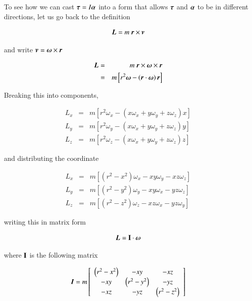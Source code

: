 To see how we can cast ${\boldsymbol{\tau}}=I{\boldsymbol{\alpha}}$ into a form that allows ${\boldsymbol{\tau}}$ and ${\boldsymbol{\alpha}}$ to be in different directions, let us go back to the definition 

\begin{equation}
{\boldsymbol{L}}=m \ {\boldsymbol{r}}\times {\boldsymbol{v}}
\end{equation}

and write ${\boldsymbol{v}} = {\boldsymbol{\omega}}\times{\boldsymbol{r}}$


\begin{eqnarray}
{\boldsymbol{L}} &=& m \ {\boldsymbol{r}}\times {\boldsymbol{\omega}}\times{\boldsymbol{r}}\\
 &=& m \left[r^2{\boldsymbol{\omega}} -  \left({\boldsymbol{r}}\cdot {\boldsymbol{\omega}}\right){\boldsymbol{r}}\right]\\
\end{eqnarray}


Breaking this into components,  

\begin{eqnarray}
L_x &=& m \left[r^2\omega_x -  \left(x\omega_x + y\omega_y + z\omega_z\right)x\right]\\
L_y &=& m \left[r^2\omega_y -  \left(x\omega_x + y\omega_y + z\omega_z\right)y\right]\\
L_z &=& m \left[r^2\omega_z -  \left(x\omega_x + y\omega_y + z\omega_z\right)z\right]
\end{eqnarray}


and distributing the coordinate  

\begin{eqnarray}
L_x &=& m \left[\left(r^2-x^2\right)\omega_x -  xy\omega_y - xz\omega_z\right]\\
L_y &=& m \left[\left(r^2-y^2\right)\omega_y -  xy\omega_x - yz\omega_z\right]\\
L_z &=& m \left[\left(r^2-z^2\right)\omega_z -  xz\omega_x - yz\omega_y\right]
\end{eqnarray}


writing this in matrix form

\begin{equation}
{\boldsymbol{L}}= \boldsymbol{\mathrm{I}} \cdot {\boldsymbol{\omega}}
\end{equation}


where $\boldsymbol{\mathrm{I}}$ is the following matrix

\begin{equation}
{\boldsymbol{I}} = m\left[\begin{array}{ccc}
 \left(r^2-x^2\right) &-  xy &- xz \\
 -  xy & \left(r^2-y^2\right) & - yz \\
 -  xz &- yz & \left(r^2-z^2\right)
\end{array}\right]
\end{equation}


